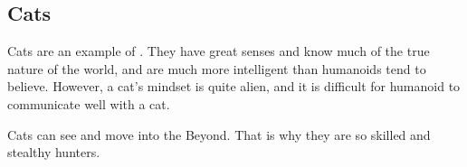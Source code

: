 \begin{comment}
  \subsection{Buopoth}
  \target{buopoths}
  The buopoths are shy, forest-dwelling animals. 
  They are taken directly from some of \HPLovecraft's stories as a tribute/reference/\trope{ShoutOut}{shout-out}. 
  
  They look like elephants with smaller ears and bigger eyes. 
  Maybe they can be tamed. 
  
  \lyricstitle{\emph{Call of Cthulhu} RPG p.193}{
    \quo{%
      \ldots{} he had seen quaint lumbering buopoths come shyly from the wood to drink\ldots{}}
  }
\end{comment}













\subsection{Cats}
Cats are an example of . 
They have great senses and know much of the true nature of the world, and are much more intelligent than humanoids tend to believe. 
However, a cat's mindset is quite alien, and it is difficult for humanoid  to communicate well with a cat. 

Cats can see and move into the Beyond. 
That is why they are so skilled and stealthy hunters. 









\begin{comment}
  \subsection{Dogs and wolves}
  \target{dogs}
  \target{wolves}
  Wolves and other wild canines have good sight and \hr{animals that can see into the Beyond}{know quite a bit of the Beyond}. 
  They do not have a deep an insight as cats, but their minds are closer related to those of humanoids, so wolves are easier to communicate with.
  
  Tame dogs are much further removed from their \hr{Wild}{\Wylde} roots and more deeply entangled. 
  They see less than their \Wylde{} kin, and in certain regards they are more stupid.
\end{comment}















